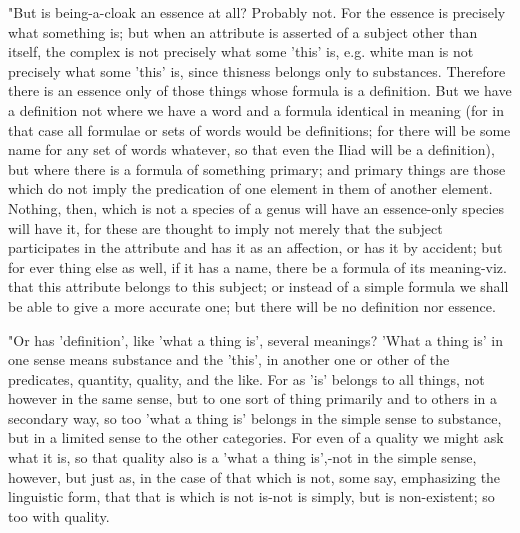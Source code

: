 "But is being-a-cloak an essence at all? Probably not. For the essence
is precisely what something is; but when an attribute is asserted
of a subject other than itself, the complex is not precisely what
some 'this' is, e.g. white man is not precisely what some 'this' is,
since thisness belongs only to substances. Therefore there is an essence
only of those things whose formula is a definition. But we have a
definition not where we have a word and a formula identical in meaning
(for in that case all formulae or sets of words would be definitions;
for there will be some name for any set of words whatever, so that
even the Iliad will be a definition), but where there is a formula
of something primary; and primary things are those which do not imply
the predication of one element in them of another element. Nothing,
then, which is not a species of a genus will have an essence-only
species will have it, for these are thought to imply not merely that
the subject participates in the attribute and has it as an affection,
or has it by accident; but for ever thing else as well, if it has
a name, there be a formula of its meaning-viz. that this attribute
belongs to this subject; or instead of a simple formula we shall be
able to give a more accurate one; but there will be no definition
nor essence. 

"Or has 'definition', like 'what a thing is', several meanings? 'What
a thing is' in one sense means substance and the 'this', in another
one or other of the predicates, quantity, quality, and the like. For
as 'is' belongs to all things, not however in the same sense, but
to one sort of thing primarily and to others in a secondary way, so
too 'what a thing is' belongs in the simple sense to substance, but
in a limited sense to the other categories. For even of a quality
we might ask what it is, so that quality also is a 'what a thing is',-not
in the simple sense, however, but just as, in the case of that which
is not, some say, emphasizing the linguistic form, that that is which
is not is-not is simply, but is non-existent; so too with quality.

